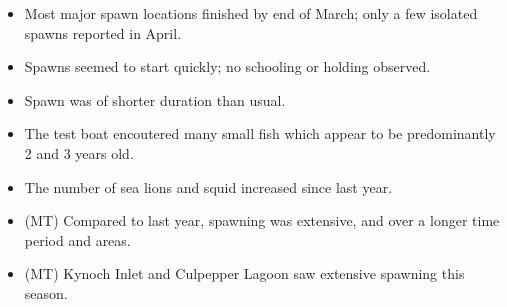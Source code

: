 \begin{itemize}
\item Most major spawn locations finished by end of March; only a few isolated spawns reported in April.
\item Spawns seemed to start quickly; no schooling or holding observed.
\item Spawn was of shorter duration than usual.
\item The test boat encoutered many small fish which appear to be predominantly 2 and 3 years old.
\item The number of sea lions and squid increased since last year.
\item (MT) Compared to last year, spawning was extensive, and over a longer time period and areas.
\item (MT) Kynoch Inlet and Culpepper Lagoon saw extensive spawning this season.
\end{itemize}